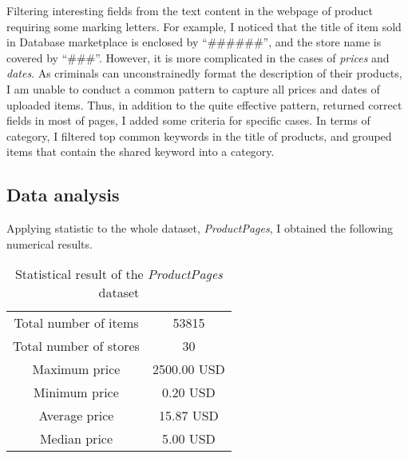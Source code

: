 Filtering interesting fields from the text content in the webpage of product requiring
some marking letters. For example, I noticed that the title of item sold in Database
marketplace is enclosed by ``\#\#\#\#\#\#'', and the store name is covered by ``\#\#\#''. However,
it is more complicated in the cases of \emph{prices} and \emph{dates}. As criminals can
unconstrainedly format the description of their products, I am unable to conduct a common
pattern to capture all prices and dates of uploaded items. Thus, in addition to the quite
effective pattern, returned correct fields in most of pages, I added some criteria for
specific cases. In terms of category, I filtered top common keywords in the title of
products, and grouped items that contain the shared keyword into a category.

\subsection{Data analysis}
%
Applying statistic to the whole dataset, \emph{ProductPages}, I obtained the following
numerical results.

\begin{table}
    \centering
    \begin{tabular}{|c|c|}
        \hline
        Total number of items & 53815\\
        Total number of stores & 30\\
        Maximum price & 2500.00 USD\\
        Minimum price & 0.20 USD\\
        Average price & 15.87 USD\\
        Median price & 5.00 USD\\
        \hline
    \end{tabular}
    \caption{Statistical result of the \emph{ProductPages} dataset}
    \label{tab:dataset_stat}
\end{table}